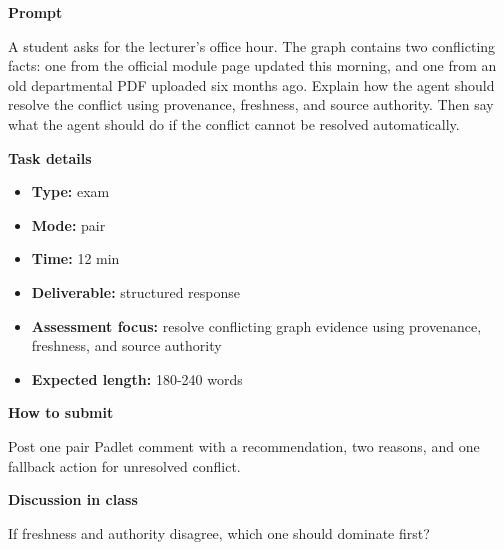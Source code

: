 \documentclass[11pt]{article}
\begin{document}
\begin{tcolorbox}[colback=white,colframe=MidnightBlue,title={Q6 Exam-Style Constructed Response},fonttitle=\bfseries,breakable]
\begin{center}
\end{center}

{\large\bfseries\color{MidnightBlue} Prompt}\par\medskip
A student asks for the lecturer's office hour. The graph contains two conflicting facts: one from the official module page updated this morning, and one from an old departmental PDF uploaded six months ago. Explain how the agent should resolve the conflict using provenance, freshness, and source authority. Then say what the agent should do if the conflict cannot be resolved automatically.

{\large\bfseries\color{MidnightBlue} Task details}\par\medskip
\begin{itemize}\item \textbf{Type:} exam
\item \textbf{Mode:} pair
\item \textbf{Time:} 12 min
\item \textbf{Deliverable:} structured response
\item \textbf{Assessment focus:} resolve conflicting graph evidence using provenance, freshness, and source authority
\item \textbf{Expected length:} 180-240 words\end{itemize}

{\large\bfseries\color{MidnightBlue} How to submit}\par\medskip
Post one pair Padlet comment with a recommendation, two reasons, and one fallback action for unresolved conflict.

{\large\bfseries\color{MidnightBlue} Discussion in class}\par\medskip
If freshness and authority disagree, which one should dominate first?


\end{tcolorbox}
\end{document}
